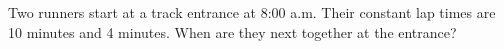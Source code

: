 Two runners start at a track entrance at 8:00 a.m. Their constant lap times are 10 minutes and 4 minutes. When are they next together at the entrance?
